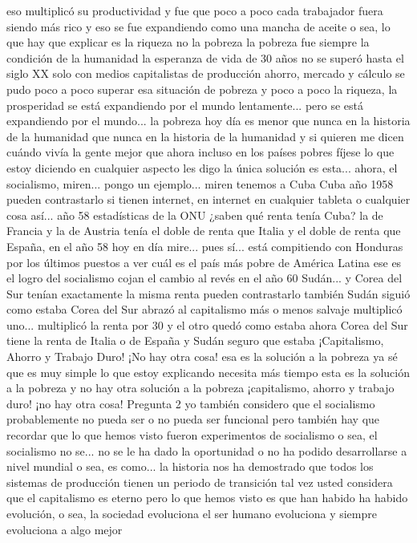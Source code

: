 eso multiplicó su productividad y fue que poco a poco cada trabajador fuera siendo más rico
y eso se fue expandiendo como una mancha de aceite o sea, lo que hay que explicar es la riqueza
no la pobreza la pobreza fue siempre la condición de la humanidad la esperanza de vida de 30 años
no se superó hasta el siglo XX solo con medios capitalistas de producción
ahorro, mercado y cálculo se pudo poco a poco superar esa situación de pobreza
y poco a poco la riqueza, la prosperidad se está expandiendo por el mundo lentamente... pero se está expandiendo por el mundo...
la pobreza hoy día es menor que nunca en la historia de la humanidad que nunca en la historia de la humanidad y si quieren me dicen cuándo vivía la gente mejor que ahora
incluso en los países pobres fíjese lo que estoy diciendo en cualquier aspecto les digo la única solución es esta...
ahora, el socialismo, miren... pongo un ejemplo... miren tenemos a Cuba Cuba año 1958
pueden contrastarlo si tienen internet, en internet en cualquier tableta o cualquier cosa así... año 58 estadísticas de la ONU
¿saben qué renta tenía Cuba? la de Francia y la de Austria
tenía el doble de renta que Italia y el doble de renta que España, en el año 58 hoy en día mire... pues sí...
está compitiendo con Honduras por los últimos puestos a ver cuál es el país más pobre de América Latina ese es el logro del socialismo
cojan el cambio al revés en el año 60 Sudán... y Corea del Sur
tenían exactamente la misma renta pueden contrastarlo también
Sudán siguió como estaba Corea del Sur abrazó al capitalismo más o menos salvaje multiplicó uno...
multiplicó la renta por 30 y el otro quedó como estaba ahora Corea del Sur tiene la renta de Italia o de España y Sudán seguro que estaba
¡Capitalismo, Ahorro y Trabajo Duro! ¡No hay otra cosa!
esa es la solución a la pobreza ya sé que es muy simple lo que estoy explicando necesita más tiempo
esta es la solución a la pobreza y no hay otra solución a la pobreza ¡capitalismo, ahorro y trabajo duro! ¡no hay otra cosa!
Pregunta 2
yo también considero que el socialismo probablemente no pueda ser o no pueda ser funcional
pero también hay que recordar que lo que hemos visto fueron experimentos de socialismo o sea, el socialismo no se...
no se le ha dado la oportunidad o no ha podido desarrollarse a nivel mundial o sea, es como...
la historia nos ha demostrado que todos los sistemas de producción tienen un periodo de transición
tal vez usted considera que el capitalismo es eterno pero lo que hemos visto es que han habido
ha habido evolución, o sea, la sociedad evoluciona el ser humano evoluciona y siempre evoluciona a algo mejor
